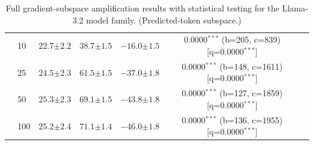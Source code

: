 \begin{table}[h!]
\begin{tabular}{l l cccc c}
 & 10 & $22.7 {\scriptstyle \pm 2.2}$ & $38.7 {\scriptstyle \pm 1.5}$ & $-16.0 {\scriptstyle \pm 1.5}$ & 0.0000$^{***}$ (b=205, c=839) [q=0.0000$^{***}$] &  \\
 & 25 & $24.5 {\scriptstyle \pm 2.3}$ & $61.5 {\scriptstyle \pm 1.5}$ & $-37.0 {\scriptstyle \pm 1.8}$ & 0.0000$^{***}$ (b=148, c=1611) [q=0.0000$^{***}$] &  \\
 & 50 & $25.3 {\scriptstyle \pm 2.3}$ & $69.1 {\scriptstyle \pm 1.5}$ & $-43.8 {\scriptstyle \pm 1.8}$ & 0.0000$^{***}$ (b=127, c=1859) [q=0.0000$^{***}$] &  \\
 & 100 & $25.2 {\scriptstyle \pm 2.4}$ & $71.1 {\scriptstyle \pm 1.4}$ & $-46.0 {\scriptstyle \pm 1.8}$ & 0.0000$^{***}$ (b=136, c=1955) [q=0.0000$^{***}$] &  \\
\bottomrule
\end{tabular}
\caption{Full gradient-subspace amplification results with statistical testing for the Llama-3.2 model family. (Predicted-token subspace.)}
\label{tab:gradsubspace_amp_stats_predtoken_llama}
\end{table}